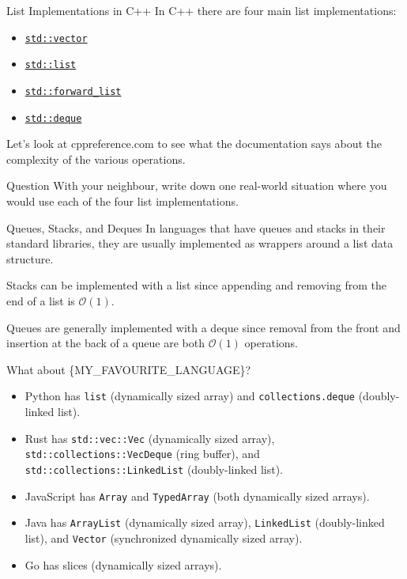 \documentclass{algo}
\begin{document}
\begin{frame}{List Implementations in C++}
    In C++ there are four main list implementations:

    \begin{itemize}
        \item \href{https://en.cppreference.com/w/cpp/container/vector}{\texttt{std::vector}}
        \item \href{https://en.cppreference.com/w/cpp/container/list}{\texttt{std::list}}
        \item \href{https://en.cppreference.com/w/cpp/container/forward_list}{\texttt{std::forward\_list}}
        \item \href{https://en.cppreference.com/w/cpp/container/deque}{\texttt{std::deque}}
    \end{itemize}

    Let's look at cppreference.com to see what the documentation says about the
    complexity of the various operations.

    \pause

    \begin{block}{Question}
        With your neighbour, write down one real-world situation where you would
        use each of the four list implementations.
    \end{block}
\end{frame}

\begin{frame}{Queues, Stacks, and Deques}
    In languages that have queues and stacks in their standard libraries, they
    are usually implemented as wrappers around a list data structure.
    \pause

    Stacks can be implemented with a list since appending and removing from the
    end of a list is $\mathcal{O}(1)$.
    \pause

    Queues are generally implemented with a deque since removal from the front
    and insertion at the back of a queue are both $\mathcal{O}(1)$ operations.
\end{frame}

\begin{frame}{What about \{MY\_FAVOURITE\_LANGUAGE\}?}
    \begin{itemize}
        \item Python has \texttt{list} (dynamically sized array) and
            \texttt{collections.deque} (doubly-linked list).
        \item Rust has \texttt{std::vec::Vec} (dynamically sized array),
            \texttt{std::collections::VecDeque} (ring buffer), and
            \texttt{std::collections::LinkedList} (doubly-linked list).
        \item JavaScript has \texttt{Array} and \texttt{TypedArray} (both
            dynamically sized arrays).
        \item Java has \texttt{ArrayList} (dynamically sized array),
            \texttt{LinkedList} (doubly-linked list), and
            \texttt{Vector} (synchronized dynamically sized array).
        \item Go has slices (dynamically sized arrays).
    \end{itemize}
\end{frame}
\end{document}
